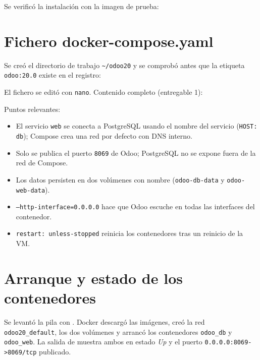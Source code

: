 Se verific\'o la instalaci\'on con la imagen de prueba:



\clearpage\section{Fichero docker-compose.yaml}
Se cre\'o el directorio de trabajo \texttt{\~{}/odoo20} y se comprob\'o antes que la etiqueta \texttt{odoo:20.0} existe en el registro:


El fichero se edit\'o con \texttt{nano}. Contenido completo (entregable 1):


Puntos relevantes:
\begin{itemize}
\item El servicio \texttt{web} se conecta a PostgreSQL usando el nombre del servicio (\texttt{HOST: db}); Compose crea una red por defecto con DNS interno.
\item Solo se publica el puerto \texttt{8069} de Odoo; PostgreSQL no se expone fuera de la red de Compose.
\item Los datos persisten en dos vol\'umenes con nombre (\texttt{odoo-db-data} y \texttt{odoo-web-data}).
\item \texttt{--http-interface=0.0.0.0} hace que Odoo escuche en todas las interfaces del contenedor.
\item \texttt{restart: unless-stopped} reinicia los contenedores tras un reinicio de la VM.
\end{itemize}


\section{Arranque y estado de los contenedores}
Se levant\'o la pila con . Docker descarg\'o las im\'agenes, cre\'o la red \texttt{odoo20\_default}, los dos vol\'umenes y arranc\'o los contenedores \texttt{odoo\_db} y \texttt{odoo\_web}. La salida de  muestra ambos en estado \emph{Up} y el puerto \texttt{0.0.0.0:8069->8069/tcp} publicado.

